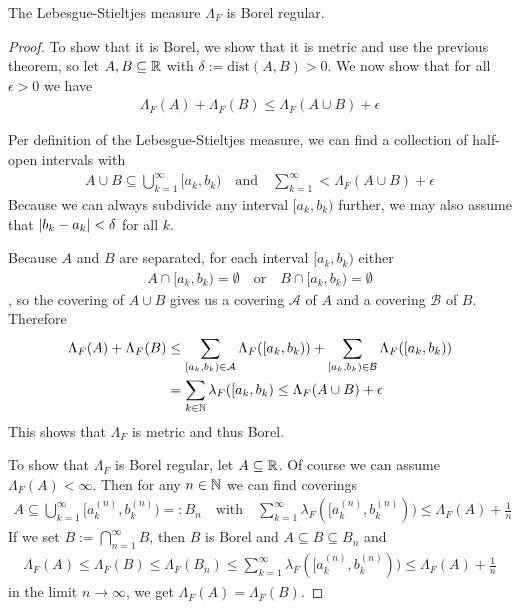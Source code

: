 \begin{thm}[] \label{thm:stieltjes-is-borel-regular}
  The Lebesgue-Stieltjes measure $\Lambda_F$ is Borel regular.
\end{thm}
\begin{proof}
  To show that it is Borel, we show that it is metric and use the previous theorem, so let $A,B \subseteq \mathbb{R}$ with $\delta := \text{dist}(A,B) > 0$.
  We now show that for all $\epsilon > 0$ we have
  \begin{align*}
    \Lambda_F(A) + \Lambda_F(B) \leq \Lambda_F(A \cup B) + \epsilon
  \end{align*}

  Per definition of the Lebesgue-Stieltjes measure, we can find a collection of half-open intervals with
  \begin{align*}
    A \cup B \subseteq \bigcup_{k=1}^{\infty} [a_k,b_k) \quad \text{and} \quad \sum_{k=1}^{\infty} < \Lambda_F(A \cup B) + \epsilon
  \end{align*}
  Because we can always subdivide any interval $[a_k,b_k)$ further, we may also assume that $\vert b_k - a_k\vert < \delta$ for all $k$.

  Because $A$ and $B$ are separated, for each interval $[a_k,b_k)$ either
  \begin{align*}
    A \cap  [a_k,b_k) = \emptyset \quad \text{or} \quad 
    B \cap  [a_k,b_k) = \emptyset 
  \end{align*}
  , so the covering of $A \cup B$ gives us a covering $\mathcal{A}$ of $A$ and a covering $\mathcal{B}$ of $B$.
  Therefore
  \begin{align*}
    \Lambda_F(A) + \Lambda_F(B) 
    &\leq 
    \sum_{[a_k,b_k) \in \mathcal{A}} \Lambda_F([a_k,b_k))
    +
    \sum_{[a_k,b_k) \in \mathcal{B}} \Lambda_F([a_k,b_k))\\
    &= \sum_{k\in \mathbb{N}} \lambda_F([a_k,b_k) \leq \Lambda_F(A \cup B) + \epsilon
  \end{align*}
  This shows that $\Lambda_F$ is metric and thus Borel.

  To show that $\Lambda_F$ is Borel regular, let $A \subseteq \mathbb{R}$.
  Of course we can assume $\Lambda_F(A) < \infty$.
  Then for any $n \in \mathbb{N}$ we can find coverings 
  \begin{align*}
    A \subseteq \bigcup_{k=1}^{\infty} [a_k^{(n)},b_k^{(n)}) =: B_n \quad \text{with} \quad \sum_{k=1}^{\infty} \lambda_F([a_k^{(n)},b_k^{(n)})) \leq \Lambda_F(A) + \frac{1}{n}
  \end{align*}
  If we set $B := \bigcap_{n=1}^{\infty}B$, then $B$ is Borel and $A \subseteq B \subseteq B_n$ and 
  \begin{align*}
    \Lambda_F(A) \leq \Lambda_F(B) \leq \Lambda_F(B_n) \leq \sum_{k=1}^{\infty}\lambda_F([a_k^{(n)},b_k^{(n)})) \leq \Lambda_F(A) + \frac{1}{n}
  \end{align*}
  in the limit $n \to \infty$, we get $\Lambda_F(A) = \Lambda_F(B)$.
\end{proof}

